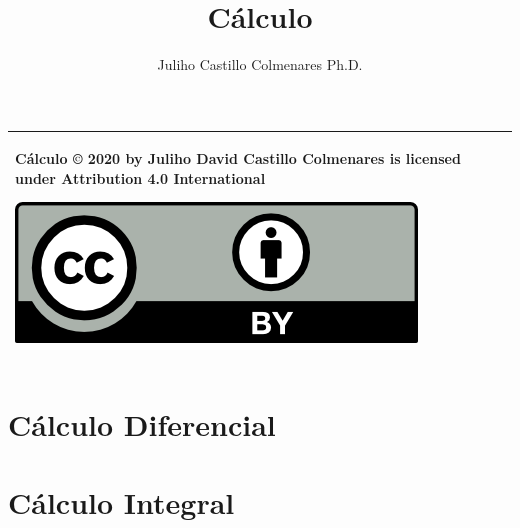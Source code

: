 \documentclass{tufte-book}
\title{Cálculo}
\author[github.com/julihocc]{Juliho Castillo Colmenares Ph.D.}
\begin{document}
	\maketitle
\begin{tabular}{|p{}|}
	\hline
Cálculo © 2020 by Juliho David Castillo Colmenares is licensed under Attribution 4.0 International
	\begin{center}
		\includegraphics[scale=1]{./licencia/by.png}
	\end{center}\\
	\hline
\end{tabular}
\tableofcontents

\chapter{Cálculo Diferencial}








\chapter{Cálculo Integral}








\end{document}
